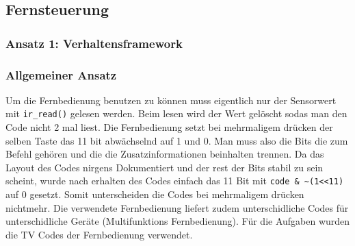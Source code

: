 \subsection{Fernsteuerung}
\label{fernsteuerung}

\subsubsection{Ansatz 1: Verhaltensframework}

\subsubsection{Allgemeiner Ansatz}

Um die Fernbedienung benutzen zu können muss eigentlich nur der Sensorwert mit \verb|ir_read()| gelesen werden. Beim lesen wird der Wert gelöscht sodas man den Code nicht 2 mal liest. Die Fernbedienung setzt bei mehrmaligem drücken der selben Taste das 11 bit abwächselnd auf 1 und 0. Man muss also die Bits die zum Befehl gehören und die die Zusatzinformationen beinhalten trennen. Da das Layout des Codes nirgens Dokumentiert und der rest der Bits stabil zu sein scheint, wurde nach erhalten des Codes einfach das 11 Bit mit \verb|code & ~(1<<11)| auf 0 gesetzt. Somit unterscheiden die Codes bei mehrmaligem drücken nichtmehr. Die verwendete Fernbedienung liefert zudem unterschidliche Codes für unterschidliche Geräte (Multifunktions Fernbedienung). Für die Aufgaben wurden die TV Codes der Fernbedienung verwendet.

